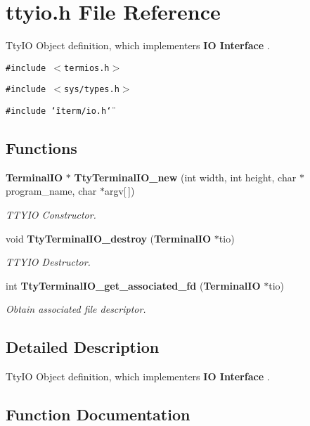 \section{ttyio.h File Reference}
\label{ttyio_8h}
Tty\-IO Object definition, which implementers {\bf IO Interface } . 


{\tt \#include $<$termios.h$>$}\par
{\tt \#include $<$sys/types.h$>$}\par
{\tt \#include \char`\"{}iterm/io.h\char`\"{}}\par
\subsection*{Functions}
\begin{CompactItemize}
\item 
{\bf Terminal\-IO} $\ast$ {\bf Tty\-Terminal\-IO\_\-new} (int width, int height, char $\ast$program\_\-name, char $\ast$argv[$\,$])
\begin{CompactList}\small\item\em TTYIO Constructor.\item\end{CompactList}\item 
void {\bf Tty\-Terminal\-IO\_\-destroy} ({\bf Terminal\-IO} $\ast$tio)
\begin{CompactList}\small\item\em TTYIO Destructor.\item\end{CompactList}\item 
int {\bf Tty\-Terminal\-IO\_\-get\_\-associated\_\-fd} ({\bf Terminal\-IO} $\ast$tio)
\begin{CompactList}\small\item\em Obtain associated file descriptor.\item\end{CompactList}\end{CompactItemize}


\subsection{Detailed Description}
Tty\-IO Object definition, which implementers {\bf IO Interface } .



\subsection{Function Documentation}

